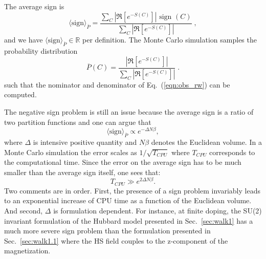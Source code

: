 The average sign is 
\begin{equation}\label{eqn:sign_rw}
	 \langle \text{sign} \rangle_{\overline{P}} =    \frac { \sum_{C}  \left|  \Re \left[ e^{-S(C)} \right]   \right|   \text{ sign }(C) }  {  \sum_{C}   \left| \Re \left[ e^{-S(C)} \right] \right|  } \;,
\end{equation}
and we have  $\langle \text{sign} \rangle_{\overline{P}} \in \mathbb{R}$ per definition.
The Monte Carlo simulation samples the probability distribution 
\begin{equation}  
	 \overline{P}(C) = \frac{ \left|  \Re \left[ e^{-S(C)} \right] \right| }{\sum_C \left|  \Re \left[ e^{-S(C)} \right]  \right| }\;.
\end{equation}
such that the nominator and denominator of  Eq.~(\ref{eqn:obs_rw})  can be computed.   

The negative sign problem is still an issue because the average sign is a ratio of two partition functions and one can argue that 
\begin{equation}
 \langle \text{sign} \rangle_{\overline{P}}   \propto e^{-  \Delta N \beta},
\end{equation}
where $\Delta $ is intensive positive quantity and $N \beta$ denotes the  Euclidean volume.    In a Monte Carlo simulation the  error scales as $ 1/\sqrt{T_{CPU}} $   where $T_{CPU}$ corresponds to the computational  time.  Since the error on the  average sign has to be much smaller than the average sign itself,   one sees that:
\begin{equation}
	T_{CPU}  \gg e^{2 \Delta N \beta}.
\end{equation}   
Two comments are in order. First, the presence of a sign problem invariably leads to an exponential increase of CPU time as a function of the Euclidean volume. And second,  $\Delta$ is formulation dependent.  
For instance, at finite doping, the SU(2) invariant formulation of the Hubbard model presented in Sec.~\ref{sec:walk1}   has a much more severe sign problem than the formulation presented in Sec.~\ref{sec:walk1.1} where the HS field couples to the z-component of the magnetization. 




 
